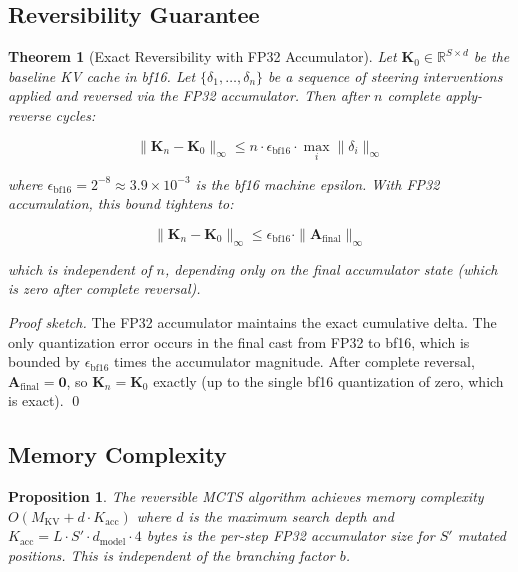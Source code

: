 \documentclass{article}
\newtheorem{theorem}{Theorem}
\newtheorem{proposition}{Proposition}
\begin{document}
\subsection{Reversibility Guarantee}

\begin{theorem}[Exact Reversibility with FP32 Accumulator]
Let $\mathbf{K}_0 \in \mathbb{R}^{S \times d}$ be the baseline KV cache in bf16. Let $\{\delta_1, \ldots, \delta_n\}$ be a sequence of steering interventions applied and reversed via the FP32 accumulator. Then after $n$ complete apply-reverse cycles:

\begin{equation}
\|\mathbf{K}_n - \mathbf{K}_0\|_\infty \leq n \cdot \epsilon_{\text{bf16}} \cdot \max_i \|\delta_i\|_\infty
\label{eq:reversibility_naive}
\end{equation}

where $\epsilon_{\text{bf16}} = 2^{-8} \approx 3.9 \times 10^{-3}$ is the bf16 machine epsilon. With FP32 accumulation, this bound tightens to:

\begin{equation}
\|\mathbf{K}_n - \mathbf{K}_0\|_\infty \leq \epsilon_{\text{bf16}} \cdot \|\mathbf{A}_{\text{final}}\|_\infty
\label{eq:reversibility_fp32}
\end{equation}

which is independent of $n$, depending only on the final accumulator state (which is zero after complete reversal).
\end{theorem}

\begin{proof}[Proof sketch]
The FP32 accumulator maintains the exact cumulative delta. The only quantization error occurs in the final cast from FP32 to bf16, which is bounded by $\epsilon_{\text{bf16}}$ times the accumulator magnitude. After complete reversal, $\mathbf{A}_{\text{final}} = \mathbf{0}$, so $\mathbf{K}_n = \mathbf{K}_0$ exactly (up to the single bf16 quantization of zero, which is exact). \qed
\end{proof}

\subsection{Memory Complexity}

\begin{proposition}
The reversible MCTS algorithm achieves memory complexity $O(M_{\text{KV}} + d \cdot K_{\text{acc}})$ where $d$ is the maximum search depth and $K_{\text{acc}} = L \cdot S' \cdot d_{\text{model}} \cdot 4$ bytes is the per-step FP32 accumulator size for $S'$ mutated positions. This is independent of the branching factor $b$.
\end{proposition}
\end{document}
